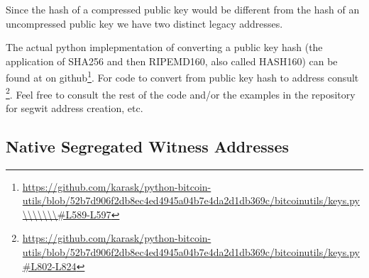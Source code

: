 \begin{note}
Since the hash of a compressed public key would be different from the hash of an uncompressed public key we have two distinct legacy addresses.
\end{note}

The actual python implepmentation of converting a public key hash (the application of SHA256 and then RIPEMD160, also called HASH160) can be found at  on github\footnote{\url{https://github.com/karask/python-bitcoin-utils/blob/52b7d906f2db8ec4ed4945a04b7e4da2d1db369c/bitcoinutils/keys.py\\\\\\\\#L589-L597}}. For code to convert from public key hash to address consult \footnote{\url{https://github.com/karask/python-bitcoin-utils/blob/52b7d906f2db8ec4ed4945a04b7e4da2d1db369c/bitcoinutils/keys.py\#L802-L824}}. Feel free to consult the rest of the code and/or the examples in the repository for segwit address creation, etc.

\subsection{Native Segregated Witness Addresses}
